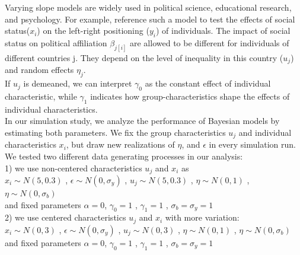 Varying slope models are widely used in political science, educational research, and psychology. For example, \cite{snijders2012} reference such a model to test the effects of social status($x_i$) on the left-right positioning ($y_i$) of individuals. The impact of social status on political affiliation $\beta_{j[i]}$ are allowed to be different for individuals of different countries j. They depend on the level of inequality in this country ($u_j$) and random effects $\eta_j$.\\
If $u_j$ is demeaned, we can interpret $\gamma_0$ as the constant effect of individual characteristic, while $\gamma_1$ indicates how group-characteristics shape the effects of individual characteristics.\\
In our simulation study, we analyze the performance of Bayesian models by estimating both parameters. We fix the group characteristics $u_j$ and individual characteristics $x_i$, but draw new realizations of $\eta$, and $\epsilon$ in every simulation run. \\

We tested two different data generating processes in our analysis: \\

1) we use non-centered characteristics $u_j$ and $x_i$ as\\

$x_i \sim N(5,0.3)$ , $\epsilon \sim N(0,\sigma_y) $ , $u_j \sim N(5,0.3)$ , $\eta \sim N(0,1) $ , $\eta \sim N(0,\sigma_b)$\\
and fixed parameters $\alpha=0$, $\gamma_0=1$ , $\gamma_1=1$ , $\sigma_b=\sigma_y=1$\\

2) we use centered characteristics $u_j$ and $x_i$ with more variation: \\

$x_i \sim N(0,3)$ , $\epsilon \sim N(0,\sigma_y) $ , $u_j \sim N(0,3)$ , $\eta \sim N(0,1) $ , $\eta \sim N(0,\sigma_b)$\\
and fixed parameters $\alpha=0$, $\gamma_0=1$ , $\gamma_1=1$ , $\sigma_b=\sigma_y=1$ \\

